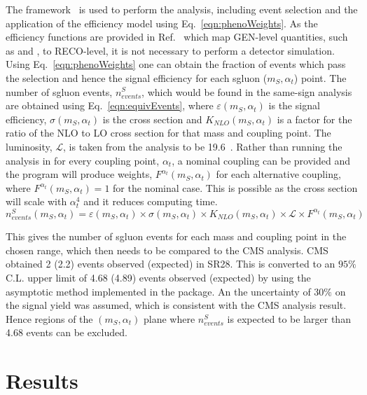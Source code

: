 The \MADAN framework~\cite{Conte2013222} is used to perform the analysis, including event selection and the application of the efficiency model using Eq.~\ref{eqn:phenoWeights}. As the efficiency functions are provided in Ref.~\cite{Chatrchyan:2013fea} which map GEN-level quantities, such as \HT and \MET, to RECO-level, it is not necessary to perform a detector simulation.
Using Eq.~\ref{eqn:phenoWeights} one can obtain the fraction of events which pass the selection and hence the signal efficiency for each sgluon ($m_{S},\alpha_{t}$) point. The number of sgluon events, $n^{S}_{events}$, which would be found in the same-sign analysis are obtained using Eq.~\ref{eqn:equivEvents}, where $\varepsilon\left(m_{S},\alpha_{t}\right)$ is the signal efficiency, $\sigma\left(m_{S},\alpha_{t}\right)$ is the cross section and $K_{NLO}\left(m_{S},\alpha_{t}\right)$ is a factor for the ratio of the NLO to LO cross section for that mass and coupling point. The luminosity, $\mathcal{L}$, is taken from the analysis to be 19.6~\fbinv. Rather than running the analysis in \MADAN for every coupling point, $\alpha_{t}$, a nominal coupling can be provided and the program will produce weights, $F^{\alpha_{t}}\left(m_{S},\alpha_{t}\right)$ for each alternative coupling, where $F^{\alpha_{t}}\left(m_{S},\alpha_{t}\right) = 1$ for the nominal case. This is possible as the cross section will scale with $\alpha_{t}^{4}$ and it reduces computing time.
\begin{equation}
n^{S}_{events}\left(m_{S},\alpha_{t}\right) = \varepsilon\left(m_{S},\alpha_{t}\right)\times \sigma\left(m_{S},\alpha_{t}\right) \times K_{NLO}\left(m_{S},\alpha_{t}\right) \times \mathcal{L}\times F^{\alpha_{t}}\left(m_{S},\alpha_{t}\right)
\label{eqn:equivEvents}
\end{equation}

This gives the number of sgluon events for each mass and coupling point in the chosen range, which then needs to be compared to the CMS analysis. CMS obtained 2 (2.2) events observed (expected) in SR28. This is converted to an $95\%$ C.L. upper limit of 4.68 (4.89) events observed (expected) by using the asymptotic \CLS method implemented in the \ROOSTAT package. An the uncertainty of $30\%$ on the signal yield was assumed, which is consistent with the CMS analysis result. Hence regions of the $\left(m_{S},\alpha_{t}\right)$ plane where $n^{S}_{events}$ is expected to be larger than 4.68 events can be excluded.


\section{Results \label{sec:sgluonResults}}

